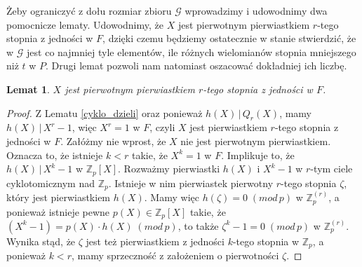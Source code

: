 \documentclass[declaration,shortabstract]{iithesis}
\theoremstyle{definition}
\theoremstyle{remark} \newtheorem{observation}{Obserwacja}
\theoremstyle{plain} \newtheorem{theorem}{Twierdzenie}
\theoremstyle{plain} \newtheorem{lemma}{Lemat}
\theoremstyle{remark} \newtheorem*{remark*}{Uwaga}
\theoremstyle{reminder} \newtheorem*{reminder*}{Przypomnienie}
\begin{document}
Żeby ograniczyć z dołu rozmiar zbioru $\mathcal{G}$ wprowadzimy i udowodnimy dwa pomocnicze lematy. Udowodnimy, że $X$ jest pierwotnym pierwiastkiem $r$-tego stopnia z jedności w $F$, dzięki czemu będziemy ostatecznie w stanie stwierdzić, że w $\mathcal{G}$ jest co najmniej tyle elementów, ile różnych wielomianów stopnia mniejszego niż $t$ w $P$. Drugi lemat pozwoli nam natomiast oszacować dokładniej ich liczbę.

\begin{lemma}\label{X_pierw}
	$X$ jest pierwotnym pierwiastkiem $r$-tego stopnia z jedności w $F$.
\end{lemma}
	
\begin{proof}
	Z Lematu \ref{cyklo_dzieli} oraz ponieważ $h(X) \, | \, Q_r(X)$, mamy $h(X) \, | \, X^r - 1$, więc $X^r = 1$ w $F$, czyli $X$ jest pierwiastkiem $r$-tego stopnia z jedności w $F$. 
	Załóżmy nie wprost, że $X$ nie jest pierwotnym pierwiastkiem. Oznacza to, że istnieje $k < r$ takie, że $X^k = 1$ w $F$. Implikuje to, że $h(X) \, | \, X^k - 1$ w $\mathbb{Z}_p[X]$. 
	Rozważmy pierwiastki $h(X)$ i $X^k - 1$ w $r$-tym ciele cyklotomicznym nad $\mathbb{Z}_p$. Istnieje w nim pierwiastek pierwotny $r$-tego stopnia $\zeta$, który jest pierwiastkiem $h(X)$. 
	Mamy więc $h(\zeta) = 0 \; (mod \, p)$ w $\mathbb{Z}_p^{(r)}$, a ponieważ istnieje pewne $p(X) \in \mathbb{Z}_p[X]$ takie, że $(X^k - 1) = p(X) \cdot h(X) \; (mod \, p)$, to także $\zeta^k - 1 = 0 \; (mod \, p)$ w $\mathbb{Z}_p^{(r)}$. Wynika stąd, że $\zeta$ jest też pierwiastkiem z jedności $k$-tego stopnia w $\mathbb{Z}_p$, a ponieważ $k < r$, mamy sprzeczność z założeniem o pierwotności $\zeta$.
\end{proof}
\end{document}
